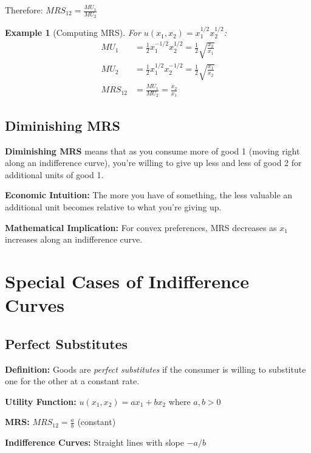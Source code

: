 \documentclass[11pt,a4paper]{article}
\newtheorem{example}{Example}
\begin{document}
Therefore: $MRS_{12} = \frac{MU_1}{MU_2}$

\begin{example}[Computing MRS]
For $u(x_1, x_2) = x_1^{1/2} x_2^{1/2}$:
\begin{align*}
MU_1 &= \frac{1}{2}x_1^{-1/2}x_2^{1/2} = \frac{1}{2}\sqrt{\frac{x_2}{x_1}}\\
MU_2 &= \frac{1}{2}x_1^{1/2}x_2^{-1/2} = \frac{1}{2}\sqrt{\frac{x_1}{x_2}}\\
MRS_{12} &= \frac{MU_1}{MU_2} = \frac{x_2}{x_1}
\end{align*}
\end{example}

\subsection{Diminishing MRS}

\textbf{Diminishing MRS} means that as you consume more of good 1 (moving right along an indifference curve), you're willing to give up less and less of good 2 for additional units of good 1.

\textbf{Economic Intuition:} The more you have of something, the less valuable an additional unit becomes relative to what you're giving up.

\textbf{Mathematical Implication:} For convex preferences, MRS decreases as $x_1$ increases along an indifference curve.

\section{Special Cases of Indifference Curves}

\subsection{Perfect Substitutes}

\textbf{Definition:} Goods are \textit{perfect substitutes} if the consumer is willing to substitute one for the other at a constant rate.

\textbf{Utility Function:} $u(x_1, x_2) = ax_1 + bx_2$ where $a, b > 0$

\textbf{MRS:} $MRS_{12} = \frac{a}{b}$ (constant)

\textbf{Indifference Curves:} Straight lines with slope $-a/b$
\end{document}
